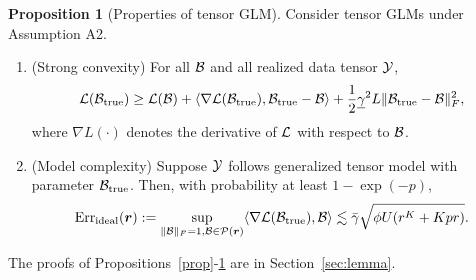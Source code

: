 \documentclass[12pt]{article}
\theoremstyle{definition}
\newtheorem{prop}{Proposition}[section]
\begin{document}
\begin{prop}[Properties of tensor GLM]\label{lem}Consider tensor GLMs under Assumption A2.
\begin{enumerate}[label=(\alph*)]
\item (Strong convexity) For all $\mathcal{B}$ and all realized data tensor $\mathcal{Y}$,
\[
\mathcal{L}(\mathcal{B}_{\textup{true}})\geq \mathcal{L}(\mathcal{B})+ \langle \nabla \mathcal{L}(\mathcal{B}_{\text{true}}), \mathcal{B}_{\textup{true}}-\mathcal{B} \rangle+{1\over 2} \underline{\gamma}^2L\lVert\mathcal{B}_{\textup{true}}-\mathcal{B}\rVert_F^2,
\] 
where $\nabla L(\cdot)$ denotes the derivative of $\mathcal{L}$ with respect to $\mathcal{B}$.   
\item (Model complexity) 
Suppose $\mathcal{Y}$ follows generalized tensor model with parameter $\mathcal{B}_{\textup{true}}$. Then, with probability at least $1-\exp(-p)$, 
\begin{equation}\label{eq:b}
\text{Err}_{\text{ideal}}(\bm{r}):= \sup_{\substack{ \lVert\mathcal{B}\rVert_F=1, \mathcal{B}\in\mathcal{P}(\bm{r})}}\langle \nabla \mathcal{L}(\mathcal{B}_{\text{true}}), \mathcal{B} \rangle\lesssim \bar \gamma \sqrt{\phi U(r^K+Kpr)}. 
\end{equation}
\end{enumerate}
\end{prop}
The proofs of Propositions~\ref{prop}-\ref{lem} are in Section~\ref{sec:lemma}. 
\end{document}

